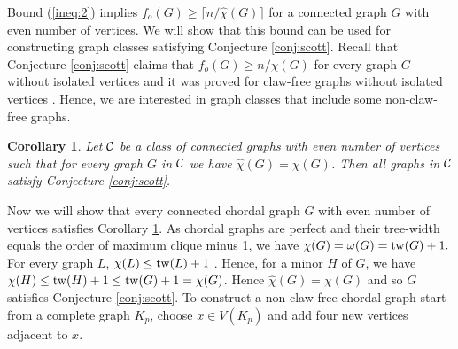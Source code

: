 \documentclass{article}
\newcommand{\mchi}{\hat{\chi}}
\newcommand{\tw}{{\rm tw}}
\newcommand{\2}{\vspace{0.2cm}}
\newtheorem{corollary}[theorem]{Corollary}
\begin{document}
Bound (\ref{ineq:2}) implies $f_o(G)\ge  \lceil n/\mchi(G) \rceil$ for a connected graph $G$ with even number of vertices. We will show that this bound can be used for constructing graph classes satisfying Conjecture \ref{conj:scott}. Recall that Conjecture \ref{conj:scott} claims that $f_o(G)\ge n/\chi(G)$ for every graph $G$ without isolated vertices and it was proved for claw-free graphs without isolated vertices \cite{Ning}. Hence, we are interested in graph classes that include some non-claw-free graphs. %

\begin{corollary}\label{cor:Scott}
Let $\cal C$ be a class of connected graphs with even number of vertices
such that for every graph $G$ in $\cal C$ we have $\mchi(G)=\chi(G)$. 
Then all graphs in $\cal C$ satisfy Conjecture \ref{conj:scott}.    
\end{corollary}

Now we will show that every connected chordal graph $G$ with even number of vertices satisfies Corollary \ref{cor:Scott}. As chordal graphs are perfect and their tree-width equals the order of maximum clique minus 1, we have $\chi(G)=\omega(G)=\tw(G)+1.$
For every graph $L$, $\chi(L)\le \tw(L)+1$ \cite{Dies}. Hence, for a minor $H$ of $G$, we have $\chi(H)\le \tw(H)+1\le \tw(G)+1=\chi(G)$. Hence $\mchi(G)=\chi(G)$ and so $G$ satisfies Conjecture \ref{conj:scott}. To construct a non-claw-free chordal graph
start from a complete graph $K_p$, choose $x\in V(K_p)$ and add four new vertices adjacent to $x$.
\end{document}
